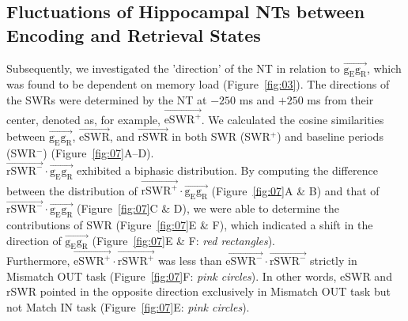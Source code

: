 \documentclass[preprint,review,12pt]{elsarticle}%
\begin{document}
\subsection{Fluctuations of Hippocampal NTs between Encoding and Retrieval States}
Subsequently, we investigated the 'direction' of the NT in relation to $\overrightarrow{\mathrm{g_{E}g_{R}}}$, which was found to be dependent on memory load (Figure~\ref{fig:03}). The directions of the SWRs were determined by the NT at $-250$ ms and $+250$ ms from their center, denoted as, for example, $\overrightarrow{\mathrm{eSWR^+}}$. We calculated the cosine similarities between $\overrightarrow{\mathrm{g_{E}g_{R}}}$, $\overrightarrow{\mathrm{eSWR}}$, and $\overrightarrow{\mathrm{rSWR}}$ in both SWR (SWR$^+$) and baseline periods (SWR$^-$) (Figure~\ref{fig:07}A--D).
\\
\indent
$\overrightarrow{\mathrm{rSWR^-}} \cdot \overrightarrow{\mathrm{g_{E}g_{R}}}$ exhibited a biphasic distribution. By computing the difference between the distribution of $\overrightarrow{\mathrm{rSWR^+}} \cdot \overrightarrow{\mathrm{g_{E}g_{R}}}$ (Figure~\ref{fig:07}A \& B) and that of $\overrightarrow{\mathrm{rSWR^-}} \cdot \overrightarrow{\mathrm{g_{E}g_{R}}}$ (Figure~\ref{fig:07}C \& D), we were able to determine the contributions of SWR (Figure~\ref{fig:07}E \& F), which indicated a shift in the direction of $\overrightarrow{\mathrm{g_{E}g_{R}}}$ (Figure~\ref{fig:07}E \& F: \textit{red rectangles}). 
\\
\indent
Furthermore, $\overrightarrow{\mathrm{eSWR^+}} \cdot \overrightarrow{\mathrm{rSWR^+}}$ was less than $\overrightarrow{\mathrm{eSWR^-}} \cdot \overrightarrow{\mathrm{rSWR^-}}$ strictly in Mismatch OUT task (Figure~\ref{fig:07}F: \textit{pink circles}). In other words, eSWR and rSWR pointed in the opposite direction exclusively in Mismatch OUT task but not Match IN task (Figure~\ref{fig:07}E: \textit{pink circles}).
\label{sec:results}
\end{document}
